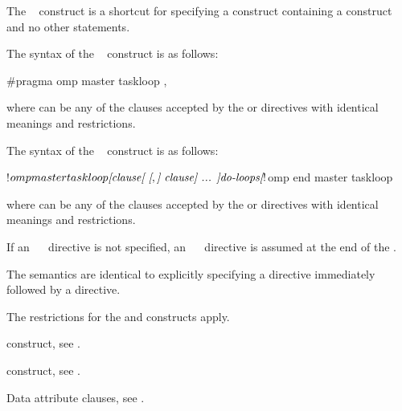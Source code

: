 \summary
The ~ construct is a shortcut for specifying a 
 construct containing a  construct and no other 
statements.

\syntax
\begin{ccppspecific}
The syntax of the ~ construct is as follows:

\begin{ompcPragma}[fontsize=\small]
#pragma omp master taskloop \plc{[clause[ [},\plc{] clause] ... ] new-line}
\end{ompcPragma}

where  can be any of the clauses accepted by the  or
 directives with identical meanings and restrictions.
\end{ccppspecific}

\begin{fortranspecific}
The syntax of the ~ construct is as follows:

\begin{ompfPragma}
!$omp master taskloop \plc{[clause[ [},\plc{] clause] ... ]}
    \plc{do-loops}
\plc{[}!$omp end master taskloop\plc{]}
\end{ompfPragma}

where  can be any of the clauses accepted by the  or
 directives with identical meanings and restrictions.

If an ~~ directive is not specified, an
~~ directive is assumed at the end of
the .
\end{fortranspecific}

\descr
The semantics are identical to explicitly specifying a  directive 
immediately followed by a  directive. 

\restrictions
The restrictions for the  and  constructs apply.

\begin{crossrefs}
\item {} construct, see
.

\item {} construct, see
.

\item Data attribute clauses, see
.
\end{crossrefs}





